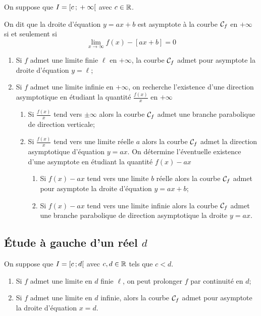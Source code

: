 On suppose que \(I=\left[ c \, ; {} +\infty \right[\) avec \(c \in \mathbb{R}\).
\begin{defdef}
  On dit que la droite d'équation \(y=ax+b\) est asymptote à la courbe 
  \(\mathcal{C}_f\) en \(+\infty\) si et seulement si
  \begin{equation}
    \lim\limits_{x \to \infty} f(x)-[ax+b]=0
  \end{equation}
\end{defdef}
\begin{enumerate}
  \item Si \(f\) admet une limite finie \(\ell\) en \(+\infty\), la courbe 
    \(\mathcal{C}_f\) admet pour asymptote la droite d'équation \(y=\ell\);
  \item Si \(f\) admet une limite infinie en \(+\infty\), on recherche 
    l'existence d'une direction asymptotique en étudiant la quantité 
    \(\frac{f(x)}{x}\) en \(+\infty\)
    \begin{enumerate}
      \item Si \(\frac{f(x)}{x}\) tend vers \(\pm \infty\) alors la courbe 
        \(\mathcal{C}_f\) admet une branche parabolique de direction verticale;
      \item Si \(\frac{f(x)}{x}\) tend vers une limite réelle \(a\) alors la 
        courbe \(\mathcal{C}_f\) admet la direction asymptotique d'équation 
        \(y=ax\). On détermine l'éventuelle existence d'une asymptote en 
        étudiant la quantité \(f(x)-ax\)
        \begin{enumerate}
          \item Si \(f(x)-ax\) tend vers une limite \(b\) réelle alors la courbe 
            \(\mathcal{C}_f\) admet pour asymptote la droite d'équation \(y=ax+b\);
          \item Si \(f(x)-ax\) tend vers une limite infinie alors la courbe 
            \(\mathcal{C}_f\) admet une branche parabolique de direction 
            asymptotique la droite \(y=ax\).
        \end{enumerate}
    \end{enumerate}
\end{enumerate}

\subsection{Étude à gauche d'un réel \(d\)}

On suppose que \(I=\left[ c \, ; {} d \right[\) avec \(c,d \in \mathbb{R}\) tels que \(c<d\).

\begin{enumerate}
  \item Si \(f\) admet une limite en \(d\) finie \(\ell\), on peut prolonger 
    \(f\) par continuité en \(d\);
  \item Si \(f\) admet une limite en \(d\) infinie, alors la courbe 
    \(\mathcal{C}_f\) admet pour asymptote la droite d'équation \(x=d\).
\end{enumerate}

